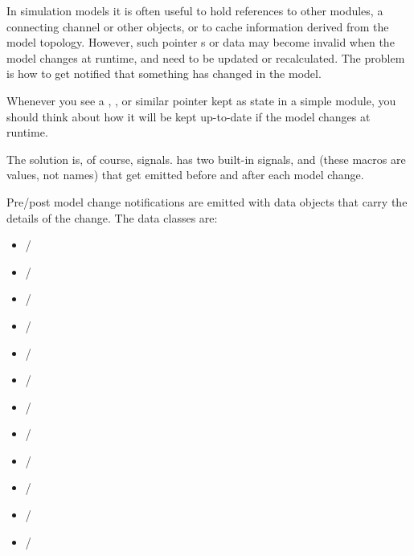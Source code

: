 \begin{note}
\begin{note}
In simulation models it is often useful to hold references to other
modules, a connecting channel or other objects, or to cache information
derived from the model topology. However, such pointer s or data may
become invalid when the model changes at runtime, and need to be updated
or recalculated. The problem is how to get notified that something has
changed in the model.

\begin{note}
  Whenever you see a , ,  or
  similar pointer kept as state in a simple module, you should think about
  how it will be kept up-to-date if the model changes at runtime.
\end{note}

The solution is, of course, signals. {\opp} has two built-in signals,
 and  (these macros
are  values, not names) that get emitted before and
after each model change.


Pre/post model change notifications are emitted with data objects that
carry the details of the change. The data classes are:

\begin{itemize}
  \item {} / 
  \item {} / 
  \item {} / 
  \item {} / 
  \item {} / 
  \item {} / 
  \item {} / 
  \item {} / 
  \item {} / 
  \item {} / 
  \item {} / 
  \item {} / 
\end{itemize}


\end{note}
\end{note}
